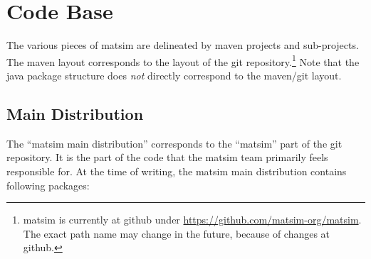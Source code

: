 \section{Code Base}
\label{sec:core-contribs-playgrounds}
The various pieces of \gls{matsim} are delineated by \gls{maven} projects and sub-projects. 
The \gls{maven} layout corresponds to the layout of the \gls{git} repository.\footnote{
\gls{matsim} is currently at \gls{github} under \url{https://github.com/matsim-org/matsim}. 
The exact path name may change in the future, \eg because of changes at \gls{github}.
}
Note that the \gls{java} package structure does \emph{not} directly correspond to the \gls{maven}/\gls{git} layout.

\subsection{Main Distribution}
\label{sec:extending-main}
The ``\gls{matsim} main distribution'' corresponds to the ``matsim'' part of the \gls{git} repository.
It is the part of the code that the \gls{matsim} team primarily feels responsible for.
%
At the time of writing, the \gls{matsim} main distribution contains following packages:
